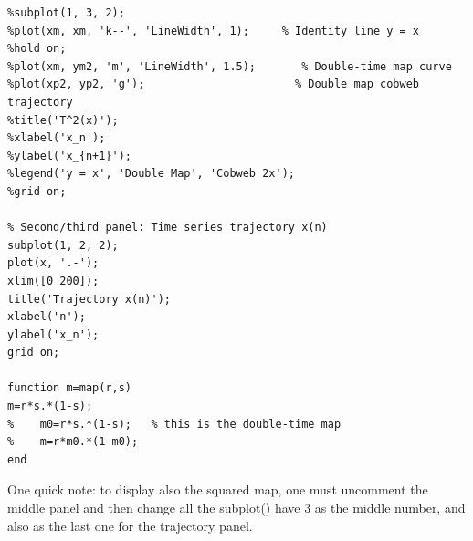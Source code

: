 \begin{lstlisting}[style=Matlab-editor, caption={Logistic Map Script}]
%Second panel: Double map
%subplot(1, 3, 2);
%plot(xm, xm, 'k--', 'LineWidth', 1);     % Identity line y = x
%hold on;
%plot(xm, ym2, 'm', 'LineWidth', 1.5);       % Double-time map curve
%plot(xp2, yp2, 'g');                       % Double map cobweb trajectory
%title('T^2(x)');
%xlabel('x_n');
%ylabel('x_{n+1}');
%legend('y = x', 'Double Map', 'Cobweb 2x');
%grid on;

% Second/third panel: Time series trajectory x(n)
subplot(1, 2, 2);
plot(x, '.-');
xlim([0 200]);
title('Trajectory x(n)');
xlabel('n');
ylabel('x_n');
grid on;

function m=map(r,s)
m=r*s.*(1-s);
%    m0=r*s.*(1-s);   % this is the double-time map
%    m=r*m0.*(1-m0);
end

\end{lstlisting}

One quick note: to display also the squared map, one must uncomment the middle panel and then change all the subplot() have 3 as the middle number, and also as the last one for the trajectory panel.